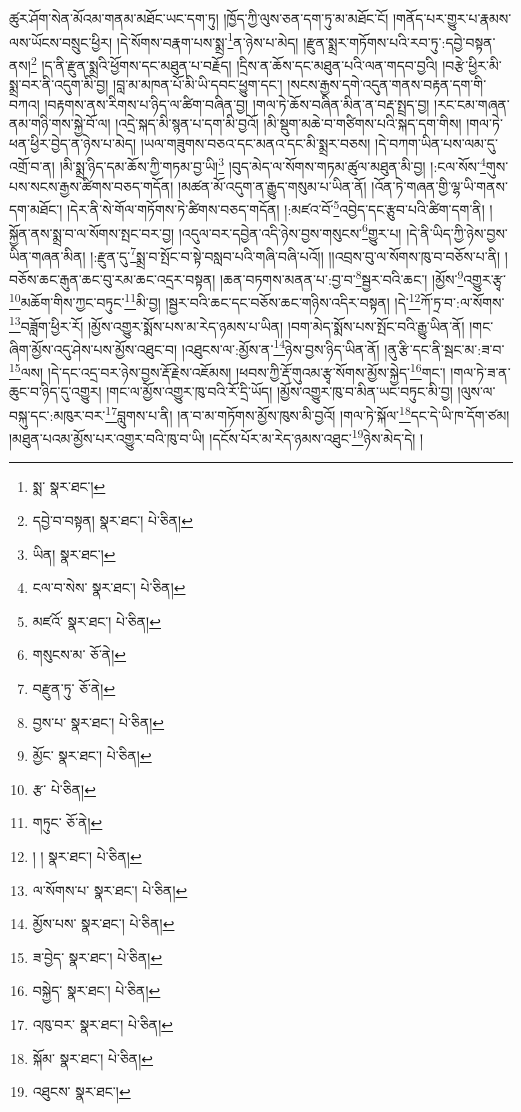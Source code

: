ཚུར་ཤོག་སེན་མོའམ་གནམ་མཐོང་ཡང་དག་ཏུ། །ཁྱོད་ཀྱི་ལུས་ཅན་དག་ཏུ་མ་མཐོང་ངོ། །གནོད་པར་གྱུར་པ་རྣམས་ལས་ཡོངས་བསྲུང་ཕྱིར། །དེ་སོགས་བརྣག་པས་སྨྲ་\footnote{སྨ་  སྣར་ཐང་། }ན་ཉེས་པ་མེད། །རྫུན་སྨྲར་གཏོགས་པའི་རབ་ཏུ་:དབྱེ་བསྟན་ནས།\footnote{དབྱེ་བ་བསྟན།  སྣར་ཐང་།  པེ་ཅིན། } །ད་ནི་རྫུན་སྨྲའི་ཕྱོགས་དང་མཐུན་པ་བརྗོད། །དྲིས་ན་ཆོས་དང་མཐུན་པའི་ལན་གདབ་བྱའི། །བརྩེ་ཕྱིར་མི་སྨྲ་བར་ནི་འདུག་མི་བྱ། །བླ་མ་མཁན་པོ་མི་ཡི་དབང་ཕྱུག་དང་། །སངས་རྒྱས་དགེ་འདུན་གནས་བརྟན་དག་གི་བཀའ། །བརྟགས་ནས་རིགས་པ་ཉིད་ལ་ཚིག་བཞིན་བྱ། །གལ་ཏེ་ཆོས་བཞིན་མིན་ན་བརྡ་སྤྲད་བྱ། །རང་ངམ་གཞན་ནམ་གཉི་གས་སྐྱེ་བོ་ལ། །འདྲེ་སྐད་མི་སྙན་པ་དག་མི་བྱའོ། །མི་སྡུག་མཆེ་བ་གཙིགས་པའི་སྐད་དག་གིས། །གལ་ཏེ་ཕན་ཕྱིར་བྱེད་ན་ཉེས་པ་མེད། །ཡལ་གཟུགས་བཅའ་དང་མནའ་དང་མི་སྨྲར་བཅས། །དེ་བཀག་ཡིན་པས་ལམ་དུ་འགྲོ་བ་ན། །མི་སྨྲ་ཉིད་དམ་ཆོས་ཀྱི་གཏམ་བྱ་ཡི།\footnote{ཡིན།  སྣར་ཐང་། } །བུད་མེད་ལ་སོགས་གཏམ་ཚུལ་མཐུན་མི་བྱ། །:ངལ་སོས་\footnote{ངལ་བ་སེས་  སྣར་ཐང་།  པེ་ཅིན། }གུས་པས་སངས་རྒྱས་ཚིགས་བཅད་གདོན། །མཚན་མོ་འདུག་ན་རྒྱུད་གསུམ་པ་ཡིན་ནོ། །འོན་ཏེ་གཞན་གྱི་ལྷ་ཡི་གནས་དག་མཐོང་། །དེར་ནི་སེ་གོལ་གཏོགས་ཏེ་ཚིགས་བཅད་གདོན། །:མཛའ་བོ་\footnote{མཛའོ་  སྣར་ཐང་།  པེ་ཅིན། }འབྱེད་དང་རྩུབ་པའི་ཚིག་དག་ནི། །སྐྱོན་ནས་སྨྲ་བ་ལ་སོགས་སྤང་བར་བྱ། །འདུལ་བར་དབྱེན་འདི་ཉེས་བྱས་གསུངས་\footnote{གསུངས་མ་  ཅོ་ནེ། }གྱུར་པ། །དེ་ནི་ཡིད་ཀྱི་ཉེས་བྱས་ཡིན་གཞན་མིན། །:རྫུན་དུ་\footnote{བརྫུན་ཏུ་  ཅོ་ནེ། }སྨྲ་བ་སྤོང་བ་སྟེ་བསླབ་པའི་གཞི་བཞི་པའོ།། །།འབྲས་བུ་ལ་སོགས་ཁུ་བ་བཅོས་པ་ནི། །བཅོས་ཆང་རྒུན་ཆང་བུ་རམ་ཆང་འདྲར་བསྟན། །ཆན་བཏགས་མནན་པ་:བྱ་བ་\footnote{བྱས་པ་  སྣར་ཐང་།  པེ་ཅིན། }སྦྱར་བའི་ཆང་། །མྱོས་\footnote{མྱོང་  སྣར་ཐང་།  པེ་ཅིན། }འགྱུར་རྩྭ་\footnote{རྩ་  པེ་ཅིན། }མཆོག་གིས་ཀྱང་བཏུང་\footnote{གཏུང་  ཅོ་ནེ། }མི་བྱ། །སྦྱར་བའི་ཆང་དང་བཅོས་ཆང་གཉིས་འདིར་བསྟན། །དེ་\footnote{། །  སྣར་ཐང་།  པེ་ཅིན། }ཀོ་ཏྲ་བ་:ལ་སོགས་\footnote{ལ་སོགས་པ་  སྣར་ཐང་།  པེ་ཅིན། }བཟློག་ཕྱིར་རོ། །མྱོས་འགྱུར་སྨོས་པས་མ་རེད་ཉམས་པ་ཡིན། །བག་མེད་སྨོས་པས་སྤོང་བའི་རྒྱུ་ཡིན་ནོ། །གང་ཞིག་མྱོས་འདུ་ཤེས་པས་མྱོས་འཐུང་བ། །འཐུངས་ལ་:མྱོས་ན་\footnote{མྱོས་པས་  སྣར་ཐང་།  པེ་ཅིན། }ཉེས་བྱས་ཉིད་ཡིན་ནོ། །ནུ་རྩི་དང་ནི་སྦང་མ་:ཟ་བ་\footnote{ཟ་བྱེད་  སྣར་ཐང་།  པེ་ཅིན། }ལས། །དེ་དང་འདྲ་བར་ཉེས་བྱས་རྡོ་རྗེས་འཇོམས། །ཕབས་ཀྱི་རྡོ་གུའམ་རྩྭ་སོགས་མྱོས་སྐྱེད་\footnote{བསྐྱེད་  སྣར་ཐང་།  པེ་ཅིན། }གང་། །གལ་ཏེ་ཟ་ན་ཆུང་བ་ཉིད་དུ་འགྱུར། །གང་ལ་མྱོས་འགྱུར་ཁུ་བའི་རོ་དྲི་ཡོད། །མྱོས་འགྱུར་ཁུ་བ་མིན་ཡང་བཏུང་མི་བྱ། །ལུས་ལ་བསྐུ་དང་:མཁུར་བར་\footnote{འཁུ་བར་  སྣར་ཐང་།  པེ་ཅིན། }བླུགས་པ་ནི། །ན་བ་མ་གཏོགས་མྱོས་ཁུས་མི་བྱའོ། །གལ་ཏེ་སྐོལ་\footnote{སྐོམ་  སྣར་ཐང་།  པེ་ཅིན། }དང་དེ་ཡི་ཁ་དོག་ཙམ། །མཐུན་པའམ་མྱོས་པར་འགྱུར་བའི་ཁུ་བ་ཡི། །དངོས་པོར་མ་རེད་ཉམས་འཐུང་\footnote{འཐུངས་  སྣར་ཐང་། }ཉེས་མེད་དེ། །
